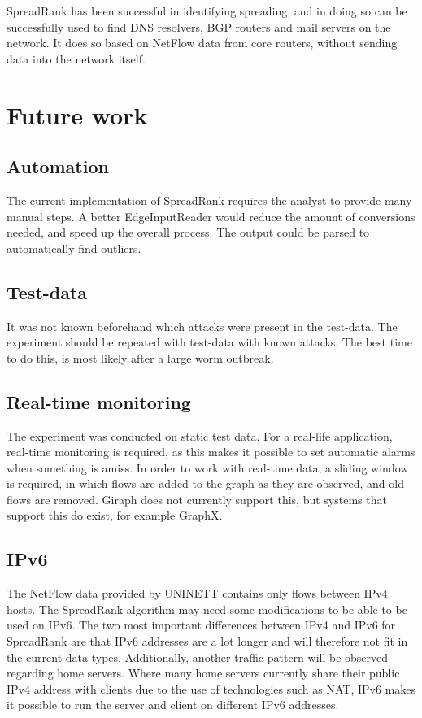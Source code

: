 SpreadRank has been successful in identifying spreading, and in doing so can be successfully used to find DNS resolvers,
 BGP routers and mail servers on the network.
It does so based on NetFlow data from core routers, without sending data into the network itself.

\section{Future work}
\subsection{Automation}
The current implementation of SpreadRank requires the analyst to provide many manual steps.
A better EdgeInputReader would reduce the amount of conversions needed,
 and speed up the overall process.
The output could be parsed to automatically find outliers.

\subsection{Test-data}
It was not known beforehand which attacks were present in the test-data.
The experiment should be repeated with test-data with known attacks.
The best time to do this, is most likely after a large worm outbreak.

\subsection{Real-time monitoring}
The experiment was conducted on static test data.
For a real-life application, real-time monitoring is required,
 as this makes it possible to set automatic alarms when something is amiss.
In order to work with real-time data, a sliding window is required,
 in which flows are added to the graph as they are observed,
and old flows are removed.
Giraph does not currently support this, but systems that support this do exist, for example GraphX.

\subsection{IPv6}
The NetFlow data provided by UNINETT contains only flows between IPv4 hosts.
The SpreadRank algorithm may need some modifications to be able to be used on IPv6.
The two most important differences between IPv4 and IPv6 for SpreadRank are that IPv6 addresses are a lot longer and will therefore not fit in the current data types.
Additionally, another traffic pattern will be observed regarding home servers.
Where many home servers currently share their public IPv4 address with clients due to the use of technologies such as NAT,
 IPv6 makes it possible to run the server and client on different IPv6 addresses.

